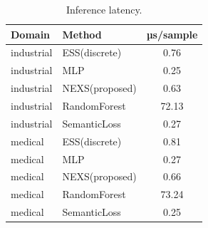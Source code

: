 \begin{table}[t]\centering
\caption{Inference latency.}
\label{tab:lat}
\begin{tabular}{llc}
\toprule
Domain & Method & µs/sample \\
\midrule
industrial & ESS(discrete) & 0.76 \\
industrial & MLP & 0.25 \\
industrial & NEXS(proposed) & 0.63 \\
industrial & RandomForest & 72.13 \\
industrial & SemanticLoss & 0.27 \\
medical & ESS(discrete) & 0.81 \\
medical & MLP & 0.27 \\
medical & NEXS(proposed) & 0.66 \\
medical & RandomForest & 73.24 \\
medical & SemanticLoss & 0.25 \\
\bottomrule
\end{tabular}
\end{table}